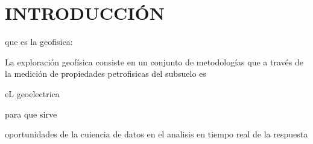 \chapter{INTRODUCCIÓN}

que es la geofisica:

La exploración geofísica consiste en un conjunto de metodologías que a través de la medición de propiedades petrofisicas del subsuelo es 

eL geoelectrica

para que sirve


oportunidades de la cuiencia de datos en el analisis en tiempo real de la respuesta 



